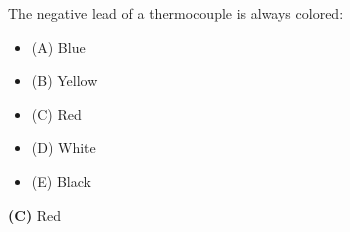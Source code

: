 

The negative lead of a thermocouple is always colored:

\begin{itemize}
\item{(A)} Blue
\vskip 5pt 
\item{(B)} Yellow
\vskip 5pt 
\item{(C)} Red
\vskip 5pt 
\item{(D)} White
\vskip 5pt 
\item{(E)} Black
\end{itemize}







{\bf (C)} Red
 









